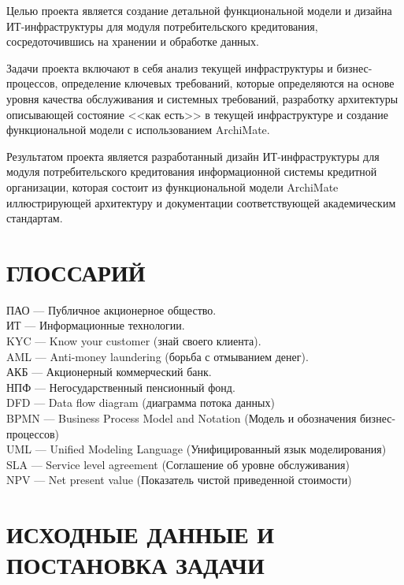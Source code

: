 \documentclass[14pt, a4paper]{extarticle}
\begin{document}
Целью проекта является создание детальной функциональной модели и
дизайна ИТ-инфраструктуры для модуля потребительского кредитования,
сосредоточившись на хранении и обработке данных.

Задачи проекта включают в себя анализ текущей инфраструктуры и
бизнес-процессов, определение ключевых требований, которые определяются на
основе уровня качества обслуживания и системных требований, разработку
архитектуры описывающей состояние <<как есть>> в текущей инфраструктуре и
создание функциональной модели с использованием ArchiMate.

Результатом проекта является разработанный дизайн ИТ-инфраструктуры для
модуля потребительского кредитования информационной системы кредитной
организации, которая состоит из функциональной модели ArchiMate иллюстрирующей
архитектуру и документации соответствующей академическим стандартам.

\section*{ГЛОССАРИЙ}
{}
\begin{raggedright}
	ПАО --- Публичное акционерное общество. \\
	ИТ --- Информационные технологии. \\
	KYC --- Know your customer (знай своего клиента). \\
	AML --- Anti-money laundering (борьба с отмыванием денег). \\
	АКБ --- Акционерный коммерческий банк. \\
	НПФ --- Негосударственный пенсионный фонд. \\
	DFD --- Data flow diagram (диаграмма потока данных) \\
	BPMN --- Business Process Model and Notation (Модель и обозначения
бизнес-процессов) \\
	UML --- Unified Modeling Language (Унифицированный язык моделирования) \\
	SLA --- Service level agreement (Соглашение об уровне обслуживания) \\
	NPV --- Net present value (Показатель чистой приведенной стоимости) \\
\end{raggedright}

\section{ИСХОДНЫЕ ДАННЫЕ И ПОСТАНОВКА ЗАДАЧИ}
\end{document}
